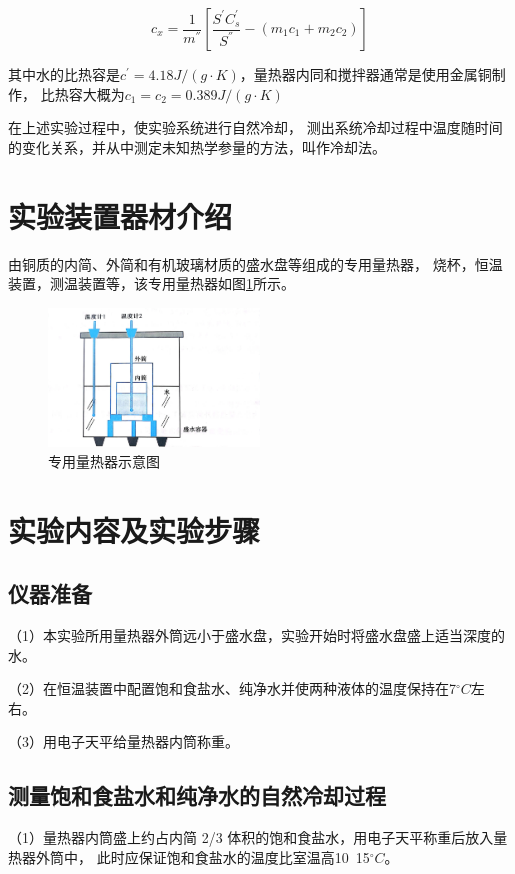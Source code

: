 \documentclass{ctexart}
\begin{document}
    \begin{equation}
      c_{x} = \frac{1}{m^{''}} [\frac{S^{'}C^{'}_{s}}{S^{''}} - (m_{1}c_{1} + m_{2}c_{2})]
    \end{equation}
    
    其中水的比热容是$c^{'} = 4.18 J/(g \cdot K)$，量热器内同和搅拌器通常是使用金属铜制作，
    比热容大概为$c_{1} = c_{2} = 0.389 J/(g \cdot K)$

    在上述实验过程中，使实验系统进行自然冷却，
    测出系统冷却过程中温度随时间的变化关系，并从中测定未知热学参量的方法，叫作冷却法。

\section{实验装置器材介绍}
由铜质的内简、外简和有机玻璃材质的盛水盘等组成的专用量热器，
烧杯，恒温装置，测温装置等，该专用量热器如图\ref{qicai}所示。

\begin{figure}[H]\label{qicai}
  \centering
  \includegraphics[width=0.5\textwidth,height=0.2\textheight]{qicai.jpg}
  \caption{专用量热器示意图}
\end{figure}

\section{实验内容及实验步骤}
  \subsection{仪器准备}
  （1）本实验所用量热器外筒远小于盛水盘，实验开始时将盛水盘盛上适当深度的水。

  （2）在恒温装置中配置饱和食盐水、纯净水并使两种液体的温度保持在7$^{\circ}C$左右。

  （3）用电子天平给量热器内筒称重。

  \subsection{测量饱和食盐水和纯净水的自然冷却过程}
  （1）量热器内筒盛上约占内简 2/3 体积的饱和食盐水，用电子天平称重后放入量热器外筒中，
  此时应保证饱和食盐水的温度比室温高10~15$^{\circ}C$。
\end{document}
